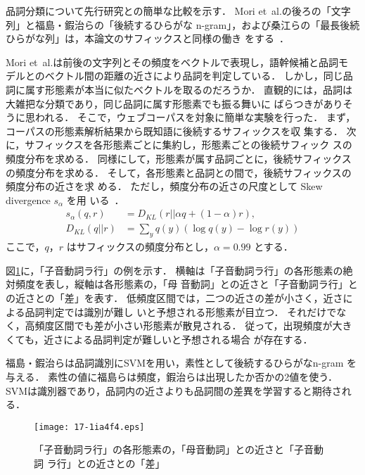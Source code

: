 \documentclass[japanese]{jnlp_1.4}
\begin{document}
品詞分類について先行研究との簡単な比較を示す．
Mori et~al.の後ろの「文字列」と福島・鍜治らの「後続するひらがな
n-gram」，および桑江らの「最長後続ひらがな列」は，本論文のサフィックスと同様の働き
をする~\cite{Mori1996full,福島健一:2007,鍜治伸裕:2009,桑江常則:2008}．

Mori et~al.は前後の文字列とその頻度をベクトルで表現し，語幹候補と品詞モ
デルとのベクトル間の距離の近さにより品詞を判定している．
しかし，同じ品詞に属す形態素が本当に似たベクトルを取るのだろうか．
直観的には，品詞は大雑把な分類であり，同じ品詞に属す形態素でも振る舞いに
ばらつきがありそうに思われる．
そこで，ウェブコーパスを対象に簡単な実験を行った．
まず，コーパスの形態素解析結果から既知語に後続するサフィックスを収
集する．
次に，サフィックスを各形態素ごとに集約し，形態素ごとの後続サフィック
スの頻度分布を求める．
同様にして，形態素が属す品詞ごとに，後続サフィックスの頻度分布を求める．
そして，各形態素と品詞との間で，後続サフィックスの頻度分布の近さを求
める．
ただし，頻度分布の近さの尺度として Skew divergence $s_\alpha$ を用
いる~\cite{Lee2001full}．
\pagebreak
\begin{align*}
 s_\alpha (q, r) & = D_{KL} (r || \alpha q + (1 - \alpha) r), \\
 D_{KL} (q||r) & = \sum_y q(y) (\log q(y) - \log r(y))
\end{align*}
ここで，$q$，$r$ はサフィックスの頻度分布とし，$\alpha = 0.99$
とする．

図\ref{fig:divergence}に，「子音動詞ラ行」の例を示す．
横軸は「子音動詞ラ行」の各形態素の絶対頻度を表し，縦軸は各形態素の，「母
音動詞」との近さと「子音動詞ラ行」との近さとの「差」を表す．
低頻度区間では，二つの近さの差が小さく，近さによる品詞判定では識別が難し
いと予想される形態素が目立つ．
それだけでなく，高頻度区間でも差が小さい形態素が散見される．
従って，出現頻度が大きくても，近さによる品詞判定が難しいと予想される場合
が存在する．


福島・鍜治らは品詞識別にSVMを用い，素性として後続するひらがなn-gram
を与える．
素性の値に福島らは頻度，鍜治らは出現したか否かの2値を使う．
SVMは識別器であり，品詞内の近さよりも品詞間の差異を学習すると期待される．

\begin{figure}[b]
\begin{center}
 \texttt{[image: 17-1ia4f4.eps]}
\end{center}
 \caption{「子音動詞ラ行」の各形態素の，「母音動詞」との近さと「子音動詞
 ラ行」との近さとの「差」}
 \label{fig:divergence}
\end{figure}
\end{document}
